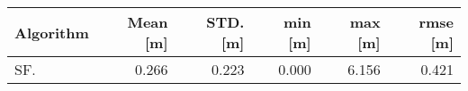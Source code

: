 \begin{tabular}{lrrrrr}
\toprule
Algorithm &  Mean [m] &   STD. [m] &   min [m] &   max [m] &  rmse [m] \\
\midrule
SF. & 0.266 & 0.223 & 0.000 & 6.156 & 0.421 \\
\bottomrule
\end{tabular}
